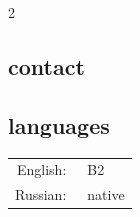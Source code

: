 \begin{paracol}{2}


	\begin{flushright}
		\subsection{contact}
		

		\subsection{languages}
		\begin{tabular}{r l}
			English: & ~B2     \\
			Russian: & ~native \\
		\end{tabular}

		
	\end{flushright}
	\switchcolumn

	

	


	


	





\end{paracol}
